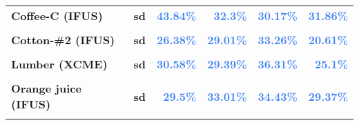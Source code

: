 \documentclass[
  authoryear,
  preprint,
  3p]{elsarticle}
\begin{document}
\begin{longtable}[t]{>{}l>{}l>{}r>{}r>{}r>{}r}
\textbf{Coffee-C (IFUS)} & \textbf{sd} & \textcolor[HTML]{4285f4}{\textbf{43.84\%}} & \textcolor[HTML]{4285f4}{\textbf{32.3\%}} & \textcolor[HTML]{4285f4}{\textbf{30.17\%}} & \textcolor[HTML]{4285f4}{\textbf{31.86\%}}\\
\textbf{\cellcolor{gray!10}{Cotton-\#2 (IFUS)}} & \textbf{\cellcolor{gray!10}{mean}} & \textcolor[HTML]{4285f4}{\textbf{\cellcolor{gray!10}{3.24\%}}} & \textcolor[HTML]{4285f4}{\textbf{\cellcolor{gray!10}{0.95\%}}} & \textcolor[HTML]{4285f4}{\textbf{\cellcolor{gray!10}{12.53\%}}} & \textcolor[HTML]{4285f4}{\textbf{\cellcolor{gray!10}{0.5\%}}}\\
\textbf{Cotton-\#2 (IFUS)} & \textbf{sd} & \textcolor[HTML]{4285f4}{\textbf{26.38\%}} & \textcolor[HTML]{4285f4}{\textbf{29.01\%}} & \textcolor[HTML]{4285f4}{\textbf{33.26\%}} & \textcolor[HTML]{4285f4}{\textbf{20.61\%}}\\
\textbf{\cellcolor{gray!10}{Lumber (XCME)}} & \textbf{\cellcolor{gray!10}{mean}} & \textcolor[HTML]{4285f4}{\textbf{\cellcolor{gray!10}{1.9\%}}} & \textcolor[HTML]{4285f4}{\textbf{\cellcolor{gray!10}{-3.58\%}}} & \textcolor[HTML]{4285f4}{\textbf{\cellcolor{gray!10}{11.74\%}}} & \textcolor[HTML]{4285f4}{\textbf{\cellcolor{gray!10}{5.06\%}}}\\
\addlinespace
\textbf{Lumber (XCME)} & \textbf{sd} & \textcolor[HTML]{4285f4}{\textbf{30.58\%}} & \textcolor[HTML]{4285f4}{\textbf{29.39\%}} & \textcolor[HTML]{4285f4}{\textbf{36.31\%}} & \textcolor[HTML]{4285f4}{\textbf{25.1\%}}\\
\textbf{\cellcolor{gray!10}{Orange juice (IFUS)}} & \textbf{\cellcolor{gray!10}{mean}} & \textcolor[HTML]{4285f4}{\textbf{\cellcolor{gray!10}{1.67\%}}} & \textcolor[HTML]{4285f4}{\textbf{\cellcolor{gray!10}{13.87\%}}} & \textcolor[HTML]{4285f4}{\textbf{\cellcolor{gray!10}{14.4\%}}} & \textcolor[HTML]{4285f4}{\textbf{\cellcolor{gray!10}{3.8\%}}}\\
\textbf{Orange juice (IFUS)} & \textbf{sd} & \textcolor[HTML]{4285f4}{\textbf{29.5\%}} & \textcolor[HTML]{4285f4}{\textbf{33.01\%}} & \textcolor[HTML]{4285f4}{\textbf{34.43\%}} & \textcolor[HTML]{4285f4}{\textbf{29.37\%}}\\
\textbf{\cellcolor{gray!10}{Sugar-\#11 (IFUS)}} & \textbf{\cellcolor{gray!10}{mean}} & \textcolor[HTML]{4285f4}{\textbf{\cellcolor{gray!10}{-4.56\%}}} & \textcolor[HTML]{4285f4}{\textbf{\cellcolor{gray!10}{24.87\%}}} & \textcolor[HTML]{4285f4}{\textbf{\cellcolor{gray!10}{11.82\%}}} & \textcolor[HTML]{4285f4}{\textbf{\cellcolor{gray!10}{-1.16\%}}}\\

\end{longtable}
\end{document}
